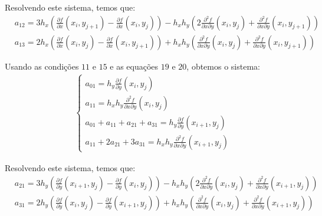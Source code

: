 \documentclass[a4paper, 12pt]{article}
\begin{document}
Resolvendo este sistema, temos que:
\begin{align}
    &a_{12} = 3h_x\left(\frac{\partial f}{\partial x}(x_i, y_{j+1}) - \frac{\partial f}{\partial x}(x_{i}, y_{j})\right) - 
    h_x h_y \left(2\frac{\partial^2 f}{\partial x \partial y}(x_i, y_j) + \frac{\partial^2 f}{\partial x \partial y}(x_i, y_{j+1}) \right)
    \tag{25} \\
    &a_{13} = 2h_x\left(\frac{\partial f}{\partial x}(x_{i}, y_{j}) - \frac{\partial f}{\partial x}(x_i, y_{j+1})\right) + 
    h_x h_y\left(\frac{\partial^2 f}{\partial x \partial y}(x_i, y_j) + \frac{\partial^2 f}{\partial x \partial y}(x_i, y_{j+1})\right)
    \tag{26}
\end{align}

Usando as condições $11$ e $15$ e as equações $19$ e $20$, obtemos o sistema:
\begin{align*}
    \begin{cases}
        a_{01} = h_{y} \frac{\partial f}{\partial y}(x_i, y_j) \\
        a_{11} = h_x h_y \frac{\partial^2 f}{\partial x \partial y}(x_i, y_j)\\
        a_{01} + a_{11} + a_{21} + a_{31} = h_y \frac{\partial f}{\partial y}(x_{i+1}, y_j)\\
        a_{11} + 2a_{21} + 3a_{31} =  h_x h_y \frac{\partial^2 f}{\partial x \partial y}(x_{i+1}, y_j)
    \end{cases}
\end{align*}

Resolvendo este sistema, temos que:
\begin{align}
    &a_{21} = 3h_y\left(\frac{\partial f}{\partial y}(x_{i+1}, y_j) - \frac{\partial f}{\partial y}(x_{i}, y_{j})\right) - 
    h_x h_y \left(2\frac{\partial^2 f}{\partial x \partial y}(x_i, y_j) + \frac{\partial^2 f}{\partial x \partial y}(x_{i+1}, y_j) \right)
    \tag{27} \\
    &a_{31} = 2h_y\left(\frac{\partial f}{\partial y}(x_{i}, y_{j}) - \frac{\partial f}{\partial y}(x_{i+1}, y_j)\right) + 
    h_x h_y\left(\frac{\partial^2 f}{\partial x \partial y}(x_i, y_j) + \frac{\partial^2 f}{\partial x \partial y}(x_{i+1}, y_j)\right)
    \tag{28}
\end{align}
\end{document}
